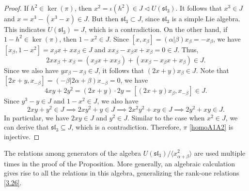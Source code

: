 \documentclass[12pt,a4paper,reqno]{amsart}
\numberwithin{equation}{section}
\numberwithin{equation}{section}
\theoremstyle{definition}
\def \al{\alpha}
\def \b {\beta}
\def \ssq{\subseteq}
\def\<{\langle}
\def\>{\rangle}
\def\sl{\mathfrak{sl}}
\begin{document}
\begin{proof}
		If $h^2\in \ker(\pi)$, then $x^2=\iota(h^2)\in J\lhd U(\sl_3)$. It follows that $x^3\in J$ and $x=x^3-(x^3-x)\in J$. But then $\sl_3\subset J$, since $\sl_3$ is a simple Lie algebra. This indicates $U(\sl_3)=J$, which is a contradiction. On the other hand, if $1-h^2\in \ker(\pi)$, then $1-x^2\in J$. Since $[x,x_\b]=(\al|\b)x_\b=-x_\b$, we have $[x_\b,1-x^2]=x_\b x+xx_\b\in J$ and 
		$xx_\b-x_\b x+x_\b=0\in J$. Thus, 
		$$2xx_\b+x_\b=(x_\b x+xx_\b)+(xx_\b-x_\b x+x_\b)\in J.$$
		Since we also have $yx_\b -x_\b\in J$, it follows that $(2x+y)x_\b\in J$. Note that $[2x+y,x_{-\b}]=(-\b| 2\al+\b) x_{-\b}=0$, we have 
		$$4xy+2y^2=(2x+y)\cdot 2y=[(2x+y)x_\b,x_{-\b}]\in J.$$
		Since $y^3-y\in J$ and $1-x^2\in J$, we also have 
		$$2xy+y^2\in J\implies 2xy^2+y\in J\implies 2x^2 y^2+xy\in J\implies 2y^2+xy\in J. $$
		In particular, we have $2xy\in J$ and $y^2\in J$. Similar to the case when $x^2\in J$, we can derive that $\sl_3\ssq J$, which is a contradiction. Therefore, $\pi$ \eqref{homoA1A2} is injective. 
	\end{proof}
	
	The relations among generators of the algebra $U(\sl_3)/\<x_{\al+\b}^2\>$ are used multiple times in the proof of the Proposition. More generally, an algebraic calculation gives rise to all the relations in this algebra, generalizing the rank-one relations \eqref{3.26}. 
	
\end{document}
